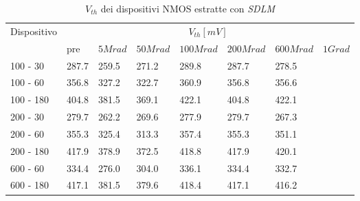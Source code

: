\documentclass[12pt, letterpaper]{book}
\begin{document}
\begin{table}[H]
  \renewcommand{\arraystretch}{1.3}
  \begin{tabular}{m{2cm} m{0.8cm} m{1.1cm} m{1.3cm} m{1.5cm} m{1.5cm} m{1.5cm} m{1cm}}
    \toprule
    \multirow{2}{*}{Dispositivo} & \multicolumn{7}{c}{$V_{th} [mV] $}                                                                    \\
    \cmidrule{2-8}
                                 & pre                                & $5Mrad$ & $50Mrad$ & $100Mrad$ & $200Mrad$ & $600Mrad$ & $1Grad$ \\
    \midrule
    100 - 30                     & 287.7                              & 259.5   & 271.2    & 289.8     & 287.7     &  278.5   &         \\
    \hline
    100 - 60                     & 356.8                              & 327.2   & 322.7    & 360.9     & 356.8     &   356.6        &         \\
    \hline
    100 - 180                    & 404.8                              & 381.5   & 369.1    & 422.1     & 404.8     &   422.1        &         \\
    \hline
    200 - 30                     & 279.7                              & 262.2   & 269.6    & 277.9     & 279.7     &   267.3        &         \\
    \hline
    200 - 60                     & 355.3                              & 325.4   & 313.3    & 357.4     & 355.3     &   351.1        &         \\
    \hline
    200 - 180                    & 417.9                              & 378.9   & 372.5    & 418.8     & 417.9     &   420.1        &         \\
    \hline
    600 - 60                     & 334.4                              & 276.0   & 304.0    & 336.1     & 334.4     &   332.7        &         \\
    \hline
    600 - 180                    & 417.1                              & 381.5   & 379.6    & 418.4     & 417.1     &   416.2        &         \\
    \bottomrule
  \end{tabular}
  \caption{$V_{th}$ dei dispositivi NMOS estratte con \emph{SDLM}}
  \label{tab:VthSDLMN}
\end{table}
\end{document}
